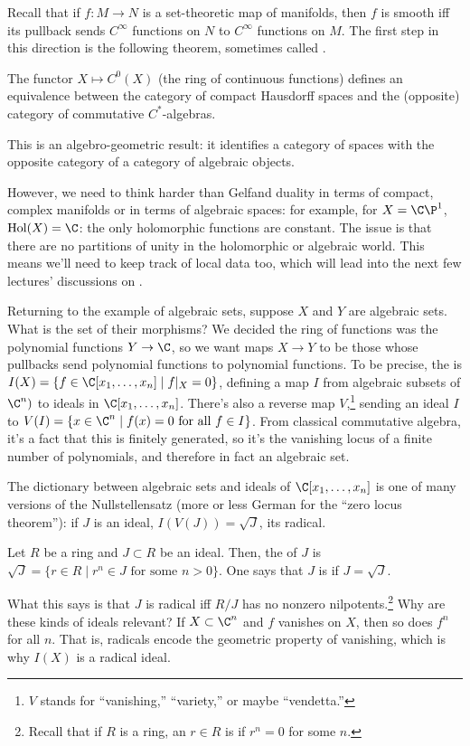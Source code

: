 Recall that if \(f:M\to N\) is a set-theoretic map of manifolds, then \(f\) is smooth iff its pullback sends
\(C^\infty\) functions on \(N\) to \(C^\infty\) functions on \(M\). The first step in this direction is the
following theorem, sometimes called .
\begin{thm}
The functor \(X\mapsto C^0(X)\) (the ring of continuous functions) defines an equivalence between the category of
compact Hausdorff spaces and the (opposite) category of commutative \(C^*\)-algebras.
\end{thm}
This is an algebro-geometric result: it identifies a category of spaces with the opposite category of a category of
algebraic objects.

However, we need to think harder than Gelfand duality in terms of compact, complex manifolds or in terms of
algebraic spaces: for example, for \(X = \C\P^1\), \(\operatorname{Hol}(X) = \C\): the only holomorphic functions
are constant. The issue is that there are no partitions of unity in the holomorphic or algebraic world. This means
we'll need to keep track of local data too, which will lead into the next few lectures' discussions on .

Returning to the example of algebraic sets, suppose \(X\) and \(Y\) are algebraic sets. What is the set of their
morphisms? We decided the ring of functions was the polynomial functions \(Y\to\C\), so we want maps \(X\to Y\) to
be those whose pullbacks send polynomial functions to polynomial functions. To be precise, the  is \(I(X) = \{f\in\C[x_1,\dots,x_n]\mid f|_X = 0\}\), defining a map \(I\) from algebraic subsets of
\(\C^n)\) to ideals in \(\C[x_1,\dots,x_n]\). There's also a reverse map \(V\),\footnote{\(V\) stands for
``vanishing,'' ``variety,'' or maybe ``vendetta.''} sending an ideal \(I\) to \(V(I) = \{x\in\C^n\mid f(x) =
0\text{ for all } f\in I\}\). From classical commutative algebra, it's a fact that this is finitely generated, so
it's the vanishing locus of a finite number of polynomials, and therefore in fact an algebraic set.

The dictionary between algebraic sets and ideals of \(\C[x_1,\dots,x_n]\) is one of many versions of the
Nullstellensatz (more or less German for the ``zero locus theorem''): if \(J\) is an ideal, \(I(V(J)) = \sqrt J\),
its radical.
\begin{defn}
Let \(R\) be a ring and \(J\subset R\) be an ideal. Then, the  of \(J\) is \(\sqrt J = \{r\in R\mid
r^n\in J\text{ for some } n > 0\}\). One says that \(J\) is  if \(J = \sqrt J\).
\end{defn}
What this says is that \(J\) is radical iff \(R/J\) has no nonzero nilpotents.\footnote{Recall that if \(R\) is a
ring, an \(r\in R\) is  if \(r^n = 0\) for some \(n\).} Why are these kinds of ideals relevant? If
\(X\subset\C^n\) and \(f\) vanishes on \(X\), then so does \(f^n\) for all \(n\). That is, radicals encode the
geometric property of vanishing, which is why \(I(X)\) is a radical ideal.

